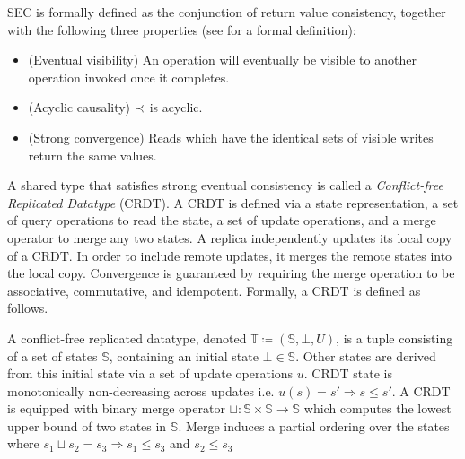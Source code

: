 SEC is formally defined as the conjunction of return value consistency, together with the following three properties (see \cite{burckhart14} for a formal definition):
\begin{itemize}
\item (Eventual visibility)
  An operation will eventually be visible to another operation invoked once it completes.
\item (Acyclic causality)
  $\prec$ is acyclic.
\item (Strong convergence)
  Reads which have the identical sets of visible writes return the same values.
\end{itemize}

A shared type that satisfies strong eventual consistency is called a \emph{Conflict-free Replicated Datatype} (CRDT). 
A CRDT is defined via a state representation, a set of query operations to read the state, a set of update operations, and a merge operator to merge any two states.
A replica independently updates its local copy of a CRDT.
In order to include remote updates, it merges the remote states into the local copy.
Convergence is guaranteed by requiring the merge operation to be associative, commutative, and idempotent.
Formally, a CRDT is defined as follows.

\begin{definition}[CRDT]
    A conflict-free replicated datatype, denoted $\mathbb{T} \coloneq (\mathbb{S}, \bot, U)$, is a tuple consisting of a set of states $\mathbb{S}$, containing an initial state $\bot \in \mathbb{S}$. 
    Other states are derived from this initial state via a set of update operations $u$. 
    CRDT state is monotonically non-decreasing across updates i.e. $u(s)=s' \Rightarrow s \le s'$.     
    A CRDT is equipped with binary merge operator $\sqcup : \mathbb{S} \times \mathbb{S} \rightarrow \mathbb{S}$ which computes the lowest upper bound of two states in $\mathbb{S}$. 
    Merge induces a partial ordering over the states where $s_1 \sqcup s_2 = s_3 \Rightarrow s_1 \le s_3$ and $s_2 \le s_3$

\end{definition}




